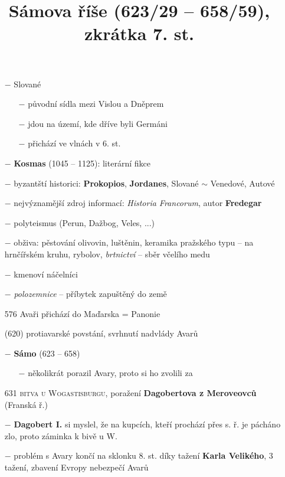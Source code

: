 \documentclass{article}
\title{\vspace{-2cm}Sámova říše (623/29 -- 658/59), zkrátka 7. st.\vspace{-1.7cm}}
\date{}
\author{}
\begin{document}
\maketitle
\begin{itemize}
    \vspace{-0.5em}
    \setlength\itemsep{0.15em}
    \item[$-$] Slované
    \begin{itemize}
        \vspace{-0.5em}
        \setlength\itemsep{0.15em}
        \item[$-$] původní sídla mezi Vislou a Dněprem
        \item[$-$] jdou na území, kde dříve byli Germáni
        \item[$-$] přichází ve vlnách v 6. st.
    \end{itemize}
    \item[$-$] \textbf{Kosmas} (1045 -- 1125): literární fikce
    \item[$-$] byzantští historici: \textbf{Prokopios}, \textbf{Jordanes}, Slované $\sim$ Venedové, Autové
    \item[$-$] nejvýznamější zdroj informací: \textit{Historia Francorum}, autor \textbf{Fredegar}
    \item[$-$] polyteismus (Perun, Dažbog, Veles, ...)
    \item[$-$] obživa: pěstování olivovin, luštěnin, keramika pražského typu -- na hrnčířském kruhu, rybolov, \textit{brtnictví} -- sběr včelího medu
    \item[$-$] kmenoví náčelníci
    \item[$-$] \textit{polozemnice} -- příbytek zapuštěný do země
    \item[576] Avaři přichází do Maďarska = Panonie
    \item[(620)] protiavarské povstání, svrhnutí nadvlády Avarů
    \item[$-$] \textbf{Sámo} (623 -- 658)
        \begin{itemize}
            \vspace{-0.5em}
            \setlength\itemsep{0.15em}
            \item[$-$] několikrát porazil Avary, proto si ho zvolili za 
        \end{itemize}
    \item[631] \textsc{bitva u Wogastisburgu}, poražení \textbf{Dagobertova z Meroveovců} (Franská ř.)
    \item[$-$] \textbf{Dagobert I.} si myslel, že na kupcích, kteří prochází přes s. ř. je pácháno zlo, proto záminka k bivě u W.
    \item[$-$] problém s Avary končí na sklonku 8. st. díky tažení \textbf{Karla Velikého}, 3 tažení, zbavení Evropy nebezpečí Avarů
\end{itemize}
\end{document}

